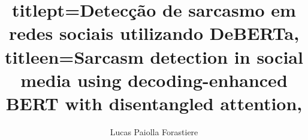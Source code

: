 

\title{
titlept={Detecção de sarcasmo em redes sociais utilizando DeBERTa},
titleen={Sarcasm detection in social media using decoding-enhanced BERT with
disentangled attention},
}

\author{Lucas Paiolla Forastiere}





